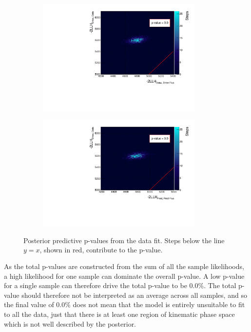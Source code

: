 \begin{figure}
\centering
\begin{subfigure}{.49\textwidth}
  \centering
	\includegraphics*[width=0.9\textwidth,clip]{figs/pval_}
\end{subfigure}
\begin{subfigure}{.49\textwidth}
  \centering
	\includegraphics*[width=0.9\textwidth,clip]{figs/pval2_}
\end{subfigure}
\caption{Posterior predictive p-values from the data fit. Steps below the line $y=x$, shown in red, contribute to the p-value.}\label{fig:pval}
\end{figure}

As the total p-values are constructed from the sum of all the sample likelihoods, a high likelihood for one sample can dominate the overall p-value. A low p-value for a single sample can therefore drive the total p-value to be 0.0$\%$. The total p-value should therefore not be interpreted as an average across all samples, and so the final value of 0.0$\%$ does not mean that the model is entirely unsuitable to fit to all the data, just that there is at least one region of kinematic phase space which is not well described by the posterior.

